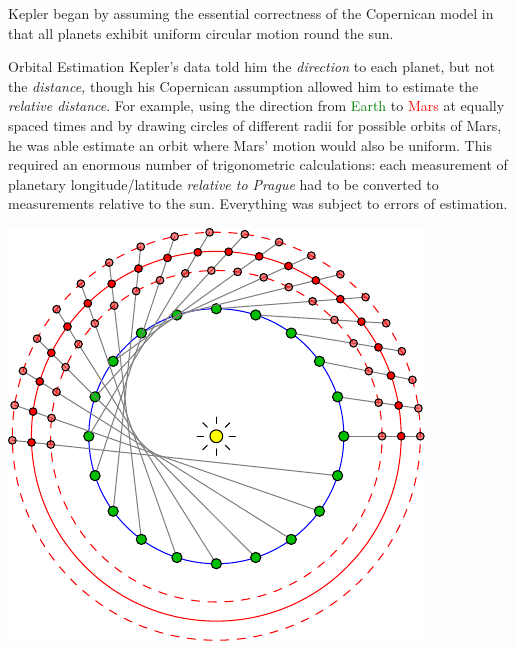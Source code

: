 \begin{description}
  \item[Starting point] Kepler began by assuming the essential correctness of the Copernican model in that all planets exhibit uniform circular motion round the sun.\par
	\begin{minipage}[t]{0.65\linewidth}\vspace{-5pt}
  	\item[Orbital Estimation] Kepler's data told him the \emph{direction} to each planet, but not the \emph{distance,} though his Copernican assumption allowed him to estimate the \emph{relative distance}.\footnotemark{} For example, using the direction from \textcolor{Green}{Earth} to \textcolor{red}{Mars} at equally spaced times and by drawing circles of different radii for possible orbits of Mars, he was able estimate an orbit where Mars' motion would also be uniform. This required an enormous number of trigonometric calculations: each measurement of planetary longitude/latitude \emph{relative to Prague} had to be converted to measurements relative to the sun. Everything was subject to errors of estimation.
	\end{minipage}
	\hfill
	\begin{minipage}[t]{0.33\linewidth}\vspace{-6pt}
		\flushright\includegraphics[scale=0.75]{ren-kepler3}
	\end{minipage}\par


\end{description}
